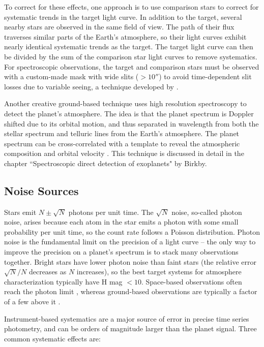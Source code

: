 \documentclass[graybox,natbib,nosecnum]{svmult}
\begin{document}
To correct for these effects, one approach is to use comparison stars to correct for systematic trends in the target light curve. In addition to the target, several nearby stars are observed in the same field of view. The path of their flux traverses similar parts of the Earth's atmosphere, so their light curves exhibit nearly identical systematic trends as the target. The target light curve can then be divided by the sum of the comparison star light curves to remove systematics.  For spectroscopic observations, the target and comparison stars must be observed with a custom-made mask with wide slits ($>10''$) to avoid time-dependent slit losses due to variable seeing, a technique developed by \cite{bean10}.

Another creative ground-based technique uses high resolution spectroscopy to detect the planet's atmosphere.  The idea is that the planet spectrum is Doppler shifted due to its orbital motion, and thus separated in wavelength from both the stellar spectrum and telluric lines from the Earth's atmosphere. The planet spectrum can be cross-correlated with a template to reveal the atmospheric composition and orbital velocity \citep[e.g.][]{snellen10}.  This technique is discussed in detail in the chapter ``Spectroscopic direct detection of exoplanets" by Birkby. 

\subsection{Noise Sources}
Stars emit $N \pm \sqrt{N}$ photons per unit time. The $\sqrt{N}$ noise, so-called photon noise, arises because each atom in the star emits a photon with some small probability per unit time, so the count rate follows a Poisson distribution. Photon noise is the fundamental limit on the precision of a light curve -- the only way to improve the precision on a planet's spectrum is to stack many observations together. Bright stars have lower photon noise than faint stars (the relative error $\sqrt{N}/N$ decreases as $N$ increases), so the best target systems for atmosphere characterization typically have H mag $< 10$.  Space-based observations often reach the photon limit \citep{sing11, deming13, ingalls16}, whereas ground-based observations are typically a factor of a few above it \citep[e.g.][]{bean13}. 

Instrument-based systematics are a major source of error in precise time series photometry, and can be orders of magnitude larger than the planet signal. Three common systematic effects are: 
\end{document}
